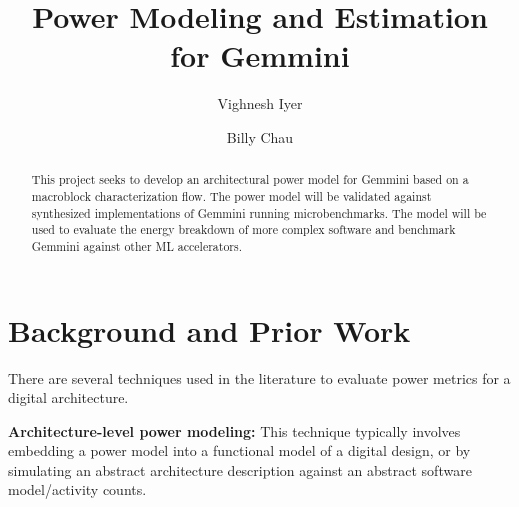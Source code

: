 \documentclass[sigconf]{acmart}
\begin{document}
\title{Power Modeling and Estimation for Gemmini}

\author{Vighnesh Iyer}

\author{Billy Chau}


\begin{abstract}
  This project seeks to develop an architectural power model for Gemmini based on a macroblock characterization flow.
  The power model will be validated against synthesized implementations of Gemmini running microbenchmarks.
  The model will be used to evaluate the energy breakdown of more complex software and benchmark Gemmini against other ML accelerators.
\end{abstract}

\maketitle

\section{Background and Prior Work}
There are several techniques used in the literature to evaluate power metrics for a digital architecture.

\textbf{Architecture-level power modeling:} This technique typically involves embedding a power model into a functional model of a digital design, or by simulating an abstract architecture description against an abstract software model/activity counts.
\end{document}
